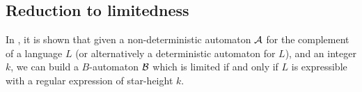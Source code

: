\subsection{Reduction to limitedness}
%
%
%
%
%

In \cite{CL08sh}, it is shown that given a non-deterministic automaton $\mathcal{A}$ for the complement of a language $L$ (or alternatively a deterministic automaton for $L$), and an integer $k$, we can build a $B$-automaton $\mathcal B$ which is limited if and only if $L$ is expressible with a regular expression of star-height $k$.

